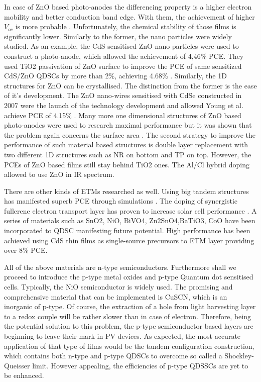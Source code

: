 \begin{enumerate}
In case of ZnO based photo-anodes the differencing property is a higher electron mobility and better conduction band edge. With them, the achievement of higher $V_{oc}$  is more probable \cite{X.Gao2017} . Unfortunately, the chemical stability of those films is significantly lower. Similarly to the former, the nano particles were widely studied. \cite{L.Lv2014a} As an example, the CdS sensitised ZnO nano particles were used to construct a photo-anode, which allowed the achievement of 4,46\% PCE. They used TiO2 passivation of ZnO surface to improve the PCE of same sensitized CdS/ZnO QDSCs by more than 2\%, achieving 4.68\% \cite{Zhang2013b}. Similarly, the 1D structures for ZnO can be crystallised. The distinction from the former is the ease of it's development. The ZnO nano-wires sensitised with CdSe constructed in 2007 were the launch of the technology development and allowed Young et al. achieve PCE of 4.15\% \cite{J.Qiu2013}. Many more one dimensional structures of ZnO based photo-anodes were used to research maximal performance but it was shown that the problem again concerns the surface area \cite{Gonzalez-Pedro2015}. The second strategy to improve the performance of such material based structures is double layer replacement with two different 1D structures such as NR on bottom and TP on top.  However, the PCEs of ZnO based films still stay behind TiO2 ones.\cite{Zhang2013b}  The Al/Cl hybrid doping allowed to use ZnO in IR spectrum.

There are other kinds of ETMs researched as well.  Using big tandem structures has manifested superb PCE through simulations \cite{GregoryF.Pach2017}. The doping of synergistic fullerene electron transport layer has proven to increase solar cell performance \cite{OleksandrVoznyy2014} . A series of materials such as SnO2, NiO, BiVO4, Zn2SnO4,BaTiO3, CoO have been incorporated to QDSC manifesting future potential. High performance has been achieved using CdS thin films as single-source precursors to ETM layer providing over 8\% PCE. \cite{RobertJ.Patterson2017}

All of the above materials are n-type semiconductors. Furthermore shall we proceed to introduce the p-type metal oxides and p-type Quantum dot sensitised cells. Typically, the NiO semiconductor is widely used. The promising and comprehensive material that can be implemented is CuSCN, which is an inorganic of p-type. Of course, the extraction of a hole from light harvesting layer to a redox couple will be rather slower than in case of electron. Therefore, being the potential solution to this problem, the p-type semiconductor based layers are beginning to leave their mark in PV devices. As expected, the most accurate application of that type of films would be the tandem configuration construction, which contains both n-type and p-type QDSCs to overcome so called  a Shockley-Queisser limit. However appealing, the efficiencies of p-type QDSSCs are yet to be enhanced.



\end{enumerate}

